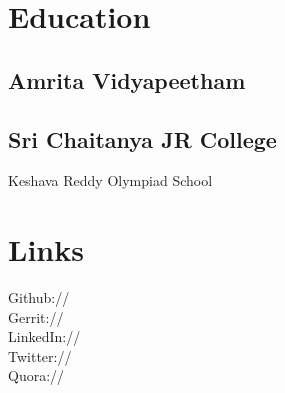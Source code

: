 \documentclass[]{deedy-resume-openfont}
\begin{document}
%
%
\lastupdated

%
%



%
%

\begin{minipage}[t]{0.33\textwidth} 


\section{Education} 

\subsection{Amrita Vidyapeetham}
\sectionsep


\subsection{Sri Chaitanya JR College}
\sectionsep

Keshava Reddy Olympiad School\\
\sectionsep


\section{Links} 
Github:// \href{https://github.com/gopavasanth}{} \\
Gerrit:// \href{https://gerrit.wikimedia.org/r/#/q/gopavasanth}{} \\
LinkedIn://  \href{https://www.linkedin.com/in/gopa-vasanth-aa926b152/}{} \\
Twitter://  \href{https://twitter.com/gopavasanth1999}{} \\
Quora://  \href{https://www.quora.com/profile/Gopa-Vasanth}{}
\sectionsep


\end{minipage}
\end{document}
